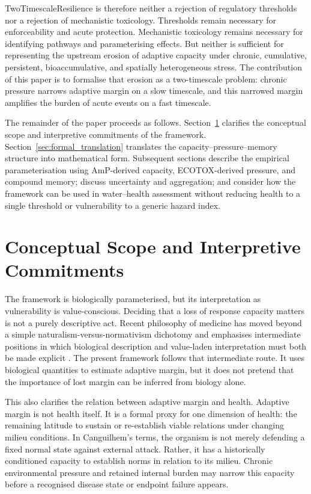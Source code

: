 TwoTimescaleResilience is therefore neither a rejection of regulatory thresholds nor a rejection of mechanistic toxicology. Thresholds remain necessary for enforceability and acute protection. Mechanistic toxicology remains necessary for identifying pathways and parameterising effects. But neither is sufficient for representing the upstream erosion of adaptive capacity under chronic, cumulative, persistent, bioaccumulative, and spatially heterogeneous stress. The contribution of this paper is to formalise that erosion as a two-timescale problem: chronic pressure narrows adaptive margin on a slow timescale, and this narrowed margin amplifies the burden of acute events on a fast timescale.

The remainder of the paper proceeds as follows. Section~\ref{sec:conceptual_scope} clarifies the conceptual scope and interpretive commitments of the framework. Section~\ref{sec:formal_translation} translates the capacity--pressure--memory structure into mathematical form. Subsequent sections describe the empirical parameterisation using AmP-derived capacity, ECOTOX-derived pressure, and compound memory; discuss uncertainty and aggregation; and consider how the framework can be used in water--health assessment without reducing health to a single threshold or vulnerability to a generic hazard index.

\section{Conceptual Scope and Interpretive Commitments}
\label{sec:conceptual_scope}

The framework is biologically parameterised, but its interpretation as vulnerability is value-conscious. Deciding that a loss of response capacity matters is not a purely descriptive act. Recent philosophy of medicine has moved beyond a simple naturalism-versus-normativism dichotomy and emphasises intermediate positions in which biological description and value-laden interpretation must both be made explicit \citep{thorell2024between,amoretti2022value}. The present framework follows that intermediate route. It uses biological quantities to estimate adaptive margin, but it does not pretend that the importance of lost margin can be inferred from biology alone.

This also clarifies the relation between adaptive margin and health. Adaptive margin is not health itself. It is a formal proxy for one dimension of health: the remaining latitude to sustain or re-establish viable relations under changing milieu conditions. In Canguilhem's terms, the organism is not merely defending a fixed normal state against external attack. Rather, it has a historically conditioned capacity to establish norms in relation to its milieu. Chronic environmental pressure and retained internal burden may narrow this capacity before a recognised disease state or endpoint failure appears.


